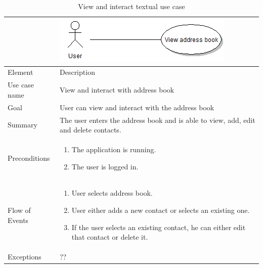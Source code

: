 \begin{table}
\begin{tabular}{p{3cm}p{12cm}}
& \includegraphics{view_address_book}\\ \hline
Element & Description \\ \hline
Use case name & View and interact with address book \\
Goal & User can view and interact with the address book \\
Summary &The user enters the address book and is able to view, add, edit and delete contacts. \\
Preconditions &
\begin{enumerate}
\item{}The application is running.
\item{}The user is logged in.
\end{enumerate} \\ \hline
Flow of Events &
\begin{enumerate}
\item{}User selects address book.
\item{}User either adds a new contact or selects an existing one.
\item{}If the user selects an existing contact, he can either edit that contact or delete it.
\end{enumerate} \\ \hline
Exceptions & ??
\end{tabular}
\caption{View and interact textual use case} \label{tab:viewandinteract}
\end{table}

